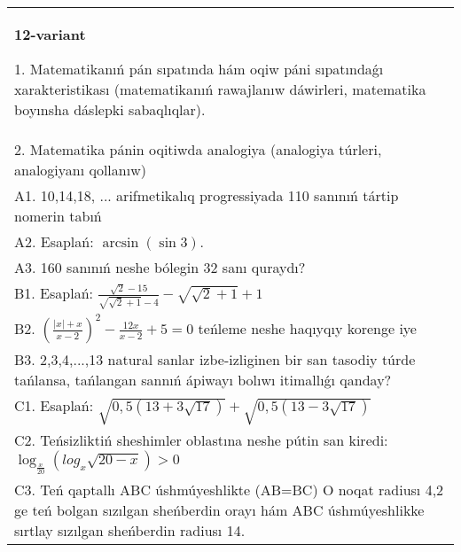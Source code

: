 \documentclass{article}
\begin{document}
\begin{tabular}{m{17cm}}
\textbf{12-variant}

1. Matematikanıń pán sıpatında hám oqiw páni sıpatındaǵı xarakteristikası (matematikanıń rawajlanıw dáwirleri, matematika boyınsha dáslepki sabaqlıqlar). \\
2. Matematika pánin oqitiwda analogiya (analogiya túrleri, analogiyanı qollanıw) \\
A1. 10,14,18, ... arifmetikalıq progressiyada 110 sanınıń tártip nomerin tabıń \\
A2. Esaplań: \(\arcsin (\sin3 ) \). \\
A3. 160 sanınıń neshe bólegin 32 sanı quraydı? \\
B1. Esaplań: \(\frac{\sqrt{2} - 15}{\sqrt{\sqrt{2} + 1} - 4} - \sqrt{\sqrt{2} + 1} + 1\) \\
B2. $(\frac{|x| + x}{x-2})^{2} - \frac{12x}{x-2} + 5 = 0$ teńleme neshe haqıyqıy korenge iye \\
B3. 2,3,4,...,13 natural sanlar izbe-izliginen bir san tasodiy túrde tańlansa, tańlangan sannıń ápiwayı bolıwı itimallıǵı qanday? \\
C1. Esaplań: \(\sqrt{0,5 (13 + 3\sqrt{17}) } + \sqrt{0,5 (13 - 3\sqrt{17}) }\) \\
C2. Teńsizliktiń sheshimler oblastına neshe pútin san kiredi:\(\log_{\frac{x}{20}} (log_{x}\sqrt{20 - x}) > 0\) \\
C3. Teń qaptallı ABC úshmúyeshlikte (AB=BC) O noqat radiusı 4,2 ge teń bolgan sızılgan sheńberdin orayı hám ABC úshmúyeshlikke sırtlay sızılgan sheńberdin radiusı 14. \\

\end{tabular}
\vspace{1cm}
\end{document}
